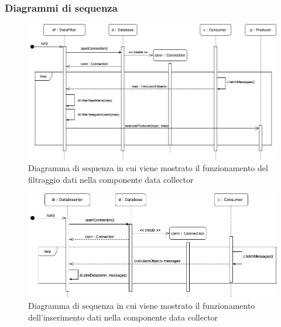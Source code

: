 		\begin{landscape}
		\subsubsection{Diagrammi di sequenza}%
			\begin{figure}[H]
				\centering
				\includegraphics[scale=0.550]{res/images/DATACOLLECTOR/DataFilter.ThreadsKafkaDataCollector.png}
				\caption{Diagramma di sequenza in cui viene mostrato il funzionamento del filtraggio dati nella componente data collector}
				\label{Diagramma 7}
			\end{figure}
			\begin{figure}[H]
				\centering
				\includegraphics[scale=0.550]{res/images/DATACOLLECTOR/DataInserter.ThreadsKafkaDataCollector.png}
				\caption{Diagramma di sequenza in cui viene mostrato il funzionamento dell'inserimento dati nella componente data collector}
				\label{Diagramma 8}
			\end{figure}
	\end{landscape}